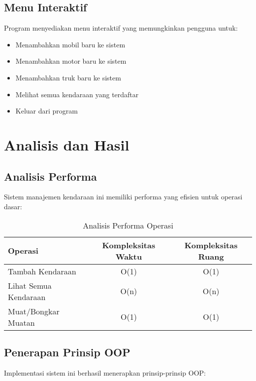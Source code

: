 \documentclass[12pt]{article}
\begin{document}
\subsection{Menu Interaktif}
Program menyediakan menu interaktif yang memungkinkan pengguna untuk:
\begin{itemize}
    \item Menambahkan mobil baru ke sistem
    \item Menambahkan motor baru ke sistem
    \item Menambahkan truk baru ke sistem
    \item Melihat semua kendaraan yang terdaftar
    \item Keluar dari program
\end{itemize}

\section{Analisis dan Hasil}

\subsection{Analisis Performa}
Sistem manajemen kendaraan ini memiliki performa yang efisien untuk operasi dasar:

\begin{table}[h!]
\centering
\caption{Analisis Performa Operasi}
\begin{tabular}{|l|c|c|}
\hline
\textbf{Operasi} & \textbf{Kompleksitas Waktu} & \textbf{Kompleksitas Ruang} \\
\hline
Tambah Kendaraan & O(1) & O(1) \\
Lihat Semua Kendaraan & O(n) & O(n) \\
Muat/Bongkar Muatan & O(1) & O(1) \\
\hline
\end{tabular}
\label{tab:performa}
\end{table}

\subsection{Penerapan Prinsip OOP}
Implementasi sistem ini berhasil menerapkan prinsip-prinsip OOP:
\end{document}
